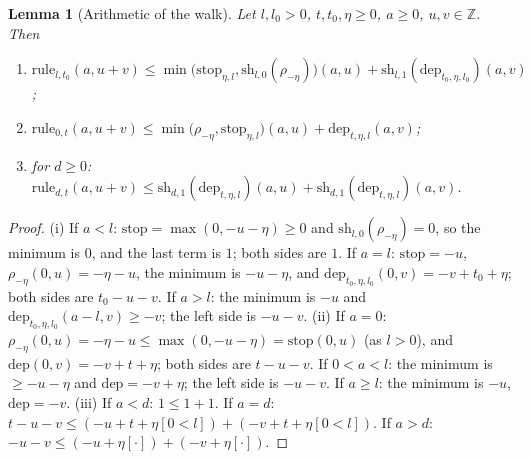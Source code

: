 \documentclass[10pt]{amsart}
\newtheorem{lemma}[theorem]{Lemma}
\theoremstyle{definition}
\theoremstyle{remark}
\newcommand{\Z}{\mathbb Z}
\begin{document}
\begin{lemma}[Arithmetic of the walk]\label{pkp:walk-arith}
Let $l,l_0>0$, $t,t_0,\eta\ge0$, $a\ge0$, $u,v\in\Z$. Then
\begin{enumerate}
\item[(i)] $\mathrm{rule}_{l,t_0}(a,u+v)\le\min\bigl(\mathrm{stop}_{\eta,l},\mathrm{sh}_{l,0}(\rho_{-\eta})
\bigr)(a,u)+\mathrm{sh}_{l,1}(\mathrm{dep}_{t_0,\eta,l_0})(a,v)$;
\item[(ii)] $\mathrm{rule}_{0,t}(a,u+v)\le\min\bigl(\rho_{-\eta},\mathrm{stop}_{\eta,l}\bigr)(a,u)+
\mathrm{dep}_{t,\eta,l}(a,v)$;
\item[(iii)] for $d\ge0$: $\mathrm{rule}_{d,t}(a,u+v)\le\mathrm{sh}_{d,1}(\mathrm{dep}_{t,\eta,l})(a,u)+
\mathrm{sh}_{d,1}(\mathrm{dep}_{t,\eta,l})(a,v)$.
\end{enumerate}
\end{lemma}

\begin{proof}
(i) If $a<l$: $\mathrm{stop}=\max(0,-u-\eta)\ge0$ and $\mathrm{sh}_{l,0}(\rho_{-\eta})=0$, so the minimum
is $0$, and the last term is $1$; both sides are $1$. If $a=l$: $\mathrm{stop}=-u$,
$\rho_{-\eta}(0,u)=-\eta-u$, the minimum is $-u-\eta$, and $\mathrm{dep}_{t_0,\eta,l_0}(0,v)=
-v+t_0+\eta$; both sides are $t_0-u-v$. If $a>l$: the minimum is $-u$ and
$\mathrm{dep}_{t_0,\eta,l_0}(a-l,v)\ge-v$; the left side is $-u-v$.
(ii) If $a=0$: $\rho_{-\eta}(0,u)=-\eta-u\le\max(0,-u-\eta)=\mathrm{stop}(0,u)$ (as $l>0$), and
$\mathrm{dep}(0,v)=-v+t+\eta$; both sides are $t-u-v$. If $0<a<l$: the minimum is
$\ge-u-\eta$ and $\mathrm{dep}=-v+\eta$; the left side is $-u-v$. If $a\ge l$: the minimum is $-u$,
$\mathrm{dep}=-v$.
(iii) If $a<d$: $1\le1+1$. If $a=d$: $t-u-v\le(-u+t+\eta[0<l])+(-v+t+\eta[0<l])$. If $a>d$:
$-u-v\le(-u+\eta[\cdot])+(-v+\eta[\cdot])$.
\end{proof}
\end{document}
